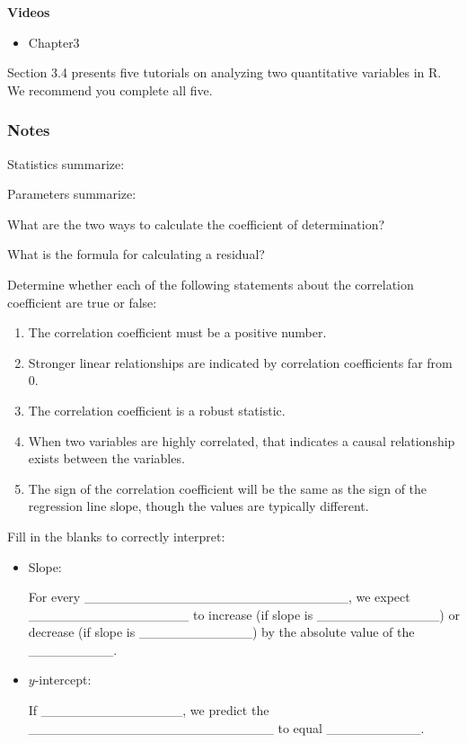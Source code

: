 \documentclass[
]{report}
\providecommand{\tightlist}{%
  \setlength{\itemsep}{0pt}\setlength{\parskip}{0pt}}
\newcommand{\rgs}{\vspace{12pt}} %
\begin{document}

\textbf{Videos}

\begin{itemize}
\tightlist
\item
  Chapter3
\end{itemize}


Section 3.4 presents five tutorials on analyzing two quantitative variables in R. We recommend you complete all five.

\hypertarget{notes-10}{%
\subsubsection*{Notes}\label{notes-10}}

Statistics summarize:
\rgs

Parameters summarize:
\rgs

What are the two ways to calculate the coefficient of determination?
\rgs

What is the formula for calculating a residual?
\rgs

Determine whether each of the following statements about the correlation coefficient are true or false:

\begin{enumerate}
\def\labelenumi{\arabic{enumi}.}
\item
  The correlation coefficient must be a positive number.
\item
  Stronger linear relationships are indicated by correlation coefficients far from 0.
\item
  The correlation coefficient is a robust statistic.
\item
  When two variables are highly correlated, that indicates a causal relationship exists between the variables.
\item
  The sign of the correlation coefficient will be the same as the sign of the regression line slope, though the values are typically different.
\end{enumerate}

Fill in the blanks to correctly interpret:

\begin{itemize}
\item
  Slope:

  For every \_\_\_\_\_\_\_\_\_\_\_\_\_\_\_\_\_\_\_\_\_\_\_\_\_\_\_\_, we expect \_\_\_\_\_\_\_\_\_\_\_\_\_\_\_\_\_ to increase (if slope is \_\_\_\_\_\_\_\_\_\_\_\_\_) or decrease (if slope is \_\_\_\_\_\_\_\_\_\_\_\_) by the absolute value of the \_\_\_\_\_\_\_\_\_.
\item
  \(y\)-intercept:

  If \_\_\_\_\_\_\_\_\_\_\_\_\_\_\_, we predict the \_\_\_\_\_\_\_\_\_\_\_\_\_\_\_\_\_\_\_\_\_\_\_\_\_\_ to equal \_\_\_\_\_\_\_\_\_\_.
\end{itemize}
\end{document}
